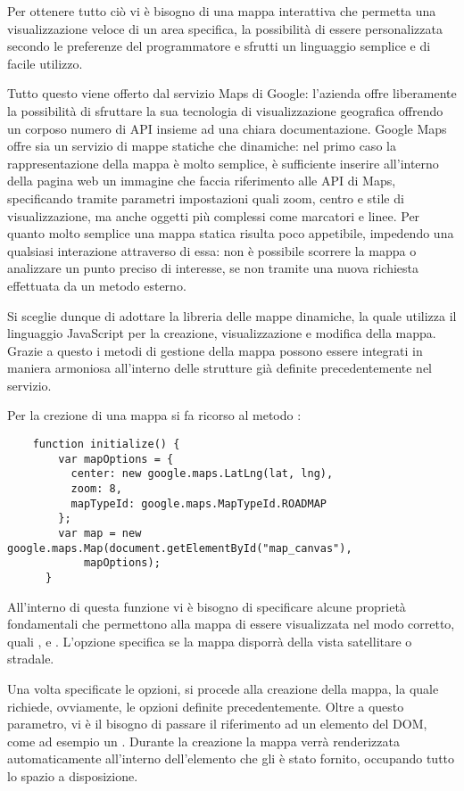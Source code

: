 Per ottenere tutto ciò vi è bisogno di una mappa interattiva che permetta una visualizzazione veloce di un area specifica, la possibilità di essere personalizzata secondo le preferenze del programmatore e sfrutti un linguaggio semplice e di facile utilizzo.

Tutto questo viene offerto dal servizio Maps di Google: l'azienda offre liberamente la possibilità di sfruttare la sua tecnologia di visualizzazione geografica offrendo un corposo numero di API insieme ad una chiara documentazione.
Google Maps offre sia un servizio di mappe statiche che dinamiche: nel primo caso la rappresentazione della mappa è molto semplice, è sufficiente inserire all'interno della pagina web un immagine che faccia riferimento alle API di Maps, specificando tramite parametri impostazioni quali zoom, centro e stile di visualizzazione, ma anche oggetti più complessi come marcatori e linee.
Per quanto molto semplice una mappa statica risulta poco appetibile, impedendo una qualsiasi interazione attraverso di essa: non è possibile scorrere la mappa o analizzare un punto preciso di interesse, se non tramite una nuova richiesta effettuata da un metodo esterno.

Si sceglie dunque di adottare la libreria delle mappe dinamiche, la quale utilizza il linguaggio JavaScript per la creazione, visualizzazione e modifica della mappa. Grazie a questo i metodi di gestione della mappa possono essere integrati in maniera armoniosa all'interno delle strutture già definite precedentemente nel servizio.

Per la crezione di una mappa si fa ricorso al metodo :

\begin{lstlisting}
    function initialize() {
        var mapOptions = {
          center: new google.maps.LatLng(lat, lng),
          zoom: 8,
          mapTypeId: google.maps.MapTypeId.ROADMAP
        };
        var map = new google.maps.Map(document.getElementById("map_canvas"),
            mapOptions);
      }
\end{lstlisting}


All'interno di questa funzione vi è bisogno di specificare alcune proprietà fondamentali che permettono alla mappa di essere visualizzata nel modo corretto, quali ,  e .
L'opzione  specifica se la mappa disporrà della vista satellitare o stradale.

Una volta specificate le opzioni, si procede alla creazione della mappa, la quale richiede, ovviamente, le opzioni definite precedentemente. Oltre a questo parametro, vi è il bisogno di passare il riferimento ad un elemento del DOM, come ad esempio un .
Durante la creazione la mappa verrà renderizzata automaticamente all'interno dell'elemento che gli è stato fornito, occupando tutto lo spazio a disposizione.
\vspace{0.5cm}

